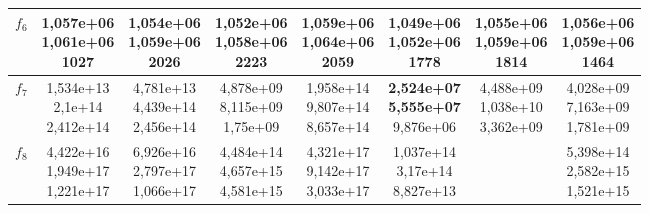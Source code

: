 \begin{table}[t]
\begin{small}
\begin{tabular}{|c|c|c|c|c|c|c|c|}
        $f_6$    & \makecell{1,057e+06 \\ 1,061e+06 \\ 1027}      & \makecell{1,054e+06 \\ 1,059e+06 \\ 2026}      & \makecell{1,052e+06 \\ 1,058e+06 \\ 2223}      & \makecell{1,059e+06 \\ 1,064e+06 \\ 2059}      & \makecell{\textbf{1,049e+06} \\ \textbf{1,052e+06} \\ 1778}      & \makecell{1,055e+06 \\ 1,059e+06 \\ 1814}      & \makecell{1,056e+06 \\ 1,059e+06 \\ 1464}      \\\hline
        $f_7$    & \makecell{1,534e+13 \\ 2,1e+14 \\ 2,412e+14}   & \makecell{4,781e+13 \\ 4,439e+14 \\ 2,456e+14} & \makecell{4,878e+09 \\ 8,115e+09 \\ 1,75e+09}  & \makecell{1,958e+14 \\ 9,807e+14 \\ 8,657e+14} & \makecell{\textbf{2,524e+07} \\ \textbf{5,555e+07} \\ 9,876e+06} & \makecell{4,488e+09 \\ 1,038e+10 \\ 3,362e+09} & \makecell{4,028e+09 \\ 7,163e+09 \\ 1,781e+09} \\\hline
        $f_8$    & \makecell{4,422e+16 \\ 1,949e+17 \\ 1,221e+17} & \makecell{6,926e+16 \\ 2,797e+17 \\ 1,066e+17} & \makecell{4,484e+14 \\ 4,657e+15 \\ 4,581e+15} & \makecell{4,321e+17 \\ 9,142e+17 \\ 3,033e+17} & \makecell{1,037e+14 \\ 3,17e+14 \\ 8,827e+13}  & & \makecell{5,398e+14 \\ 2,582e+15 \\ 1,521e+15} \\\hline

\end{tabular}
\end{small}
\end{table}

